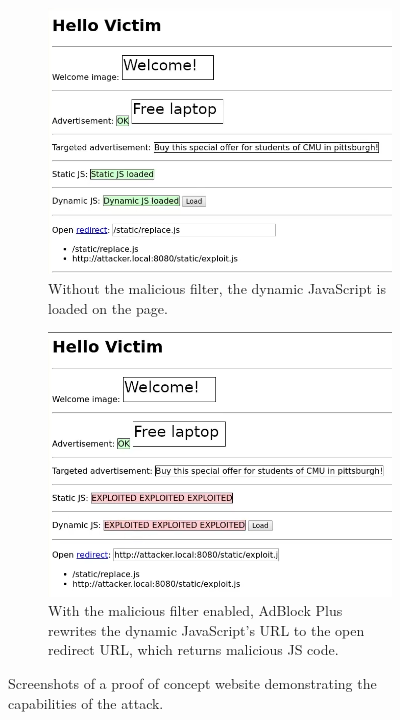 \documentclass[conference]{IEEEtran}
\begin{document}
\begin{figure}[htp]
     \centering
     \begin{subfigure}[b]{0.5\textwidth}
         \centering
         \includegraphics[width=.9\textwidth]{2-figure}
         \caption{Without the malicious filter, the dynamic JavaScript is loaded on the page.}
         \label{fig:non-vulnerable}
     \end{subfigure}
     \hfill
     \begin{subfigure}[b]{0.5\textwidth}
         \centering
         \includegraphics[width=.9\textwidth]{1-figure}
         \caption{With the malicious filter enabled,  AdBlock Plus rewrites the dynamic JavaScript's URL to the open redirect URL, which returns malicious JS code.}
         \label{fig:vulnerable}
     \end{subfigure}
        \caption{Screenshots of a proof of concept website demonstrating the capabilities of the attack.}
        \label{fig:poc}
\end{figure}
\end{document}
